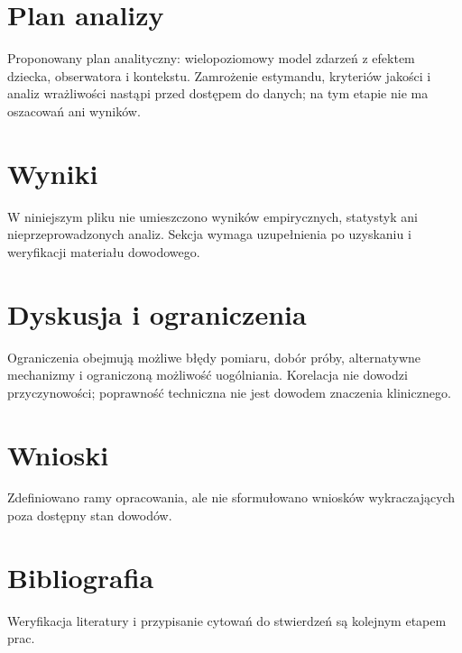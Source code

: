\documentclass[11pt,a4paper]{article}
\begin{document}
\section{Plan analizy}

Proponowany plan analityczny: wielopoziomowy model zdarzeń z efektem dziecka, obserwatora i kontekstu. Zamrożenie estymandu, kryteriów jakości i analiz wrażliwości nastąpi przed dostępem do danych; na tym etapie nie ma oszacowań ani wyników.

\section{Wyniki}

W niniejszym pliku nie umieszczono wyników empirycznych, statystyk ani nieprzeprowadzonych analiz. Sekcja wymaga uzupełnienia po uzyskaniu i weryfikacji materiału dowodowego.

\section{Dyskusja i ograniczenia}

Ograniczenia obejmują możliwe błędy pomiaru, dobór próby, alternatywne mechanizmy i ograniczoną możliwość uogólniania. Korelacja nie dowodzi przyczynowości; poprawność techniczna nie jest dowodem znaczenia klinicznego.

\section{Wnioski}

Zdefiniowano ramy opracowania, ale nie sformułowano wniosków wykraczających poza dostępny stan dowodów.

\section*{Bibliografia}

Weryfikacja literatury i przypisanie cytowań do stwierdzeń są kolejnym etapem prac.
\end{document}

